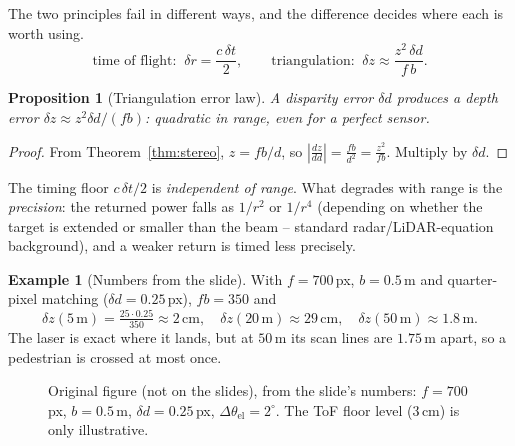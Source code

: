 \documentclass[11pt,a4paper]{article}
\numberwithin{equation}{section}
\theoremstyle{plain}
\newtheorem{proposition}[theorem]{Proposition}
\theoremstyle{definition}
\newtheorem{example}[theorem]{Example}
\begin{document}
The two principles fail in different ways, and the difference decides where each is worth using.
\[
\text{time of flight: }\ \delta r=\frac{c\,\delta t}{2},
\qquad
\text{triangulation: }\ \delta z\approx\frac{z^{2}\,\delta d}{f\,b}.
\]
 
\begin{proposition}[Triangulation error law]\label{prop:errlaw}
A disparity error $\delta d$ produces a depth error $\delta z\approx z^2\delta d/(fb)$: quadratic in range, even for a perfect sensor.
\end{proposition}
\begin{proof}
From Theorem~\ref{thm:stereo}, $z=fb/d$, so $\left|\frac{dz}{dd}\right|=\frac{fb}{d^2}=\frac{z^2}{fb}$. Multiply by $\delta d$. \qedhere
\end{proof}
 
The timing floor $c\,\delta t/2$ is \emph{independent of range}. What degrades with range is the \emph{precision}: the returned power falls as $1/r^2$ or $1/r^4$ (depending on whether the target is extended or smaller than the beam -- standard radar/LiDAR-equation background), and a weaker return is timed less precisely.
 
\begin{example}[Numbers from the slide]
With $f=700$\,px, $b=0.5$\,m and quarter-pixel matching ($\delta d=0.25$\,px), $fb=350$ and
\[
\delta z(5\,\text{m})=\tfrac{25\cdot0.25}{350}\approx 2\,\text{cm},\quad
\delta z(20\,\text{m})\approx 29\,\text{cm},\quad
\delta z(50\,\text{m})\approx 1.8\,\text{m}.
\]
The laser is exact where it lands, but at $50$\,m its scan lines are $1.75$\,m apart, so a pedestrian is crossed at most once.
\end{example}
 
\begin{figure}[htbp]
\centering
{}
\caption{Original figure (not on the slides), from the slide's numbers: $f=700$\,px, $b=0.5$\,m, $\delta d=0.25$\,px, $\Delta\theta_{\text{el}}=2^\circ$. The ToF floor level ($3$\,cm) is only illustrative.}
\end{figure}
 
\end{document}
